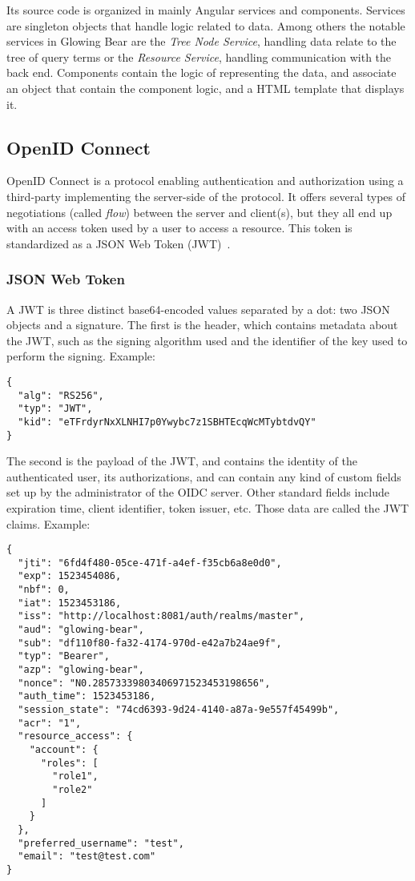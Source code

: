 Its source code is organized in mainly Angular services and components.
Services are singleton objects that handle logic related to data.
Among others the notable services in Glowing Bear are the \emph{Tree Node Service}, handling data relate to the tree of query terms or the \emph{Resource Service}, handling communication with the back end.
Components contain the logic of representing the data, and associate an object that contain the component logic, and a HTML template that displays it.


\subsection{OpenID Connect}
\label{sec:bg-oidc}

OpenID Connect is a protocol enabling authentication and authorization using a third-party implementing the server-side of the protocol.
It offers several types of negotiations (called \emph{flow}) between the server and client(s), but they all end up with an access token used by a user to access a resource.
This token is standardized as a JSON Web Token (JWT)~\cite{rfc:jwt}.

\subsubsection*{JSON Web Token}

A JWT is three distinct base64-encoded values separated by a dot: two JSON objects and a signature.
The first is the header, which contains metadata about the JWT, such as the signing algorithm used and the identifier of the key used to perform the signing.
Example:

\begin{samepage}
\begin{verbatim}
{
  "alg": "RS256",
  "typ": "JWT",
  "kid": "eTFrdyrNxXLNHI7p0Ywybc7z1SBHTEcqWcMTybtdvQY"
}
\end{verbatim}
\end{samepage}

The second is the payload of the JWT, and contains the identity of the authenticated user, its authorizations, and can contain any kind of custom fields set up by the administrator of the OIDC server.
Other standard fields include expiration time, client identifier, token issuer, etc.
Those data are called the JWT claims.
Example:


\begin{verbatim}
{
  "jti": "6fd4f480-05ce-471f-a4ef-f35cb6a8e0d0",
  "exp": 1523454086,
  "nbf": 0,
  "iat": 1523453186,
  "iss": "http://localhost:8081/auth/realms/master",
  "aud": "glowing-bear",
  "sub": "df110f80-fa32-4174-970d-e42a7b24ae9f",
  "typ": "Bearer",
  "azp": "glowing-bear",
  "nonce": "N0.28573339803406971523453198656",
  "auth_time": 1523453186,
  "session_state": "74cd6393-9d24-4140-a87a-9e557f45499b",
  "acr": "1",
  "resource_access": {
    "account": {
      "roles": [
        "role1",
        "role2"
      ]
    }
  },
  "preferred_username": "test",
  "email": "test@test.com"
}
\end{verbatim}

